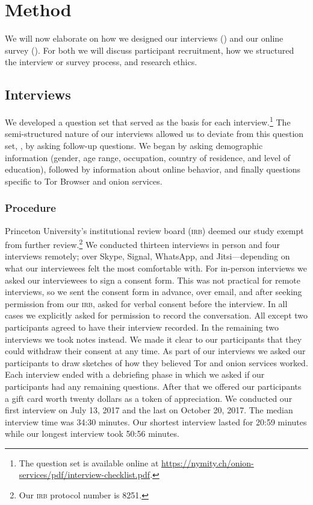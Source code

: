 \section{Method}
\label{sec:method}

We will now elaborate on how we designed our interviews
() and our online survey
().  For both we will discuss participant
recruitment, how we structured the interview or survey process, and research
ethics.

\subsection{Interviews}
\label{sec:interviews}

We developed a question set that served as the basis for each
interview.\footnote{The question set is available online at
\url{https://nymity.ch/onion-services/pdf/interview-checklist.pdf}.}  The
semi-structured nature of our interviews allowed us to deviate from this
question set, \eg, by asking follow-up questions.  We began by asking
demographic information (gender, age range, occupation, country of residence,
and level of education), followed by information about online behavior, and
finally questions specific to Tor Browser and onion services.

\subsubsection{Procedure}

Princeton University's institutional review board (\textsc{irb}) deemed our
study exempt from further review.\footnote{Our \textsc{irb} protocol number is
8251.}  We conducted thirteen interviews in person and four interviews remotely;
over Skype, Signal, WhatsApp, and Jitsi---depending on what our interviewees
felt the most comfortable with.  For in-person interviews we asked our
interviewees to sign a consent form.  This was not practical for remote
interviews, so we sent the consent form in advance, over email, and after
seeking permission from our \textsc{irb}, asked for verbal consent before the
interview.  In all cases we explicitly asked for permission to record the
conversation.  All except two participants agreed to have their interview
recorded.  In the remaining two interviews we took notes instead.  We made it
clear to our participants that they could withdraw their consent at any time.
As part of our interviews we asked our participants to draw sketches of how they
believed Tor and onion services worked.  Each interview ended with a debriefing
phase in which we asked if our participants had any remaining questions.  After
that we offered our participants a gift card worth twenty dollars as a token of
appreciation.  We conducted our first interview on July 13, 2017 and the last on
October 20, 2017.  The median interview time was 34:30 minutes.  Our shortest
interview lasted for 20:59 minutes while our longest interview took 50:56
minutes.

